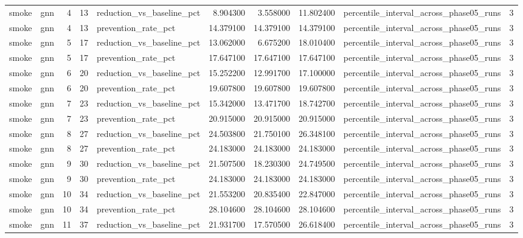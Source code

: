 \begin{tabular}{llrrlrrrlr}
smoke & gnn & 4 & 13 & reduction\_vs\_baseline\_pct & 8.904300 & 3.558000 & 11.802400 & percentile\_interval\_across\_phase05\_runs & 3 \\
smoke & gnn & 4 & 13 & prevention\_rate\_pct & 14.379100 & 14.379100 & 14.379100 & percentile\_interval\_across\_phase05\_runs & 3 \\
smoke & gnn & 5 & 17 & reduction\_vs\_baseline\_pct & 13.062000 & 6.675200 & 18.010400 & percentile\_interval\_across\_phase05\_runs & 3 \\
smoke & gnn & 5 & 17 & prevention\_rate\_pct & 17.647100 & 17.647100 & 17.647100 & percentile\_interval\_across\_phase05\_runs & 3 \\
smoke & gnn & 6 & 20 & reduction\_vs\_baseline\_pct & 15.252200 & 12.991700 & 17.100000 & percentile\_interval\_across\_phase05\_runs & 3 \\
smoke & gnn & 6 & 20 & prevention\_rate\_pct & 19.607800 & 19.607800 & 19.607800 & percentile\_interval\_across\_phase05\_runs & 3 \\
smoke & gnn & 7 & 23 & reduction\_vs\_baseline\_pct & 15.342000 & 13.471700 & 18.742700 & percentile\_interval\_across\_phase05\_runs & 3 \\
smoke & gnn & 7 & 23 & prevention\_rate\_pct & 20.915000 & 20.915000 & 20.915000 & percentile\_interval\_across\_phase05\_runs & 3 \\
smoke & gnn & 8 & 27 & reduction\_vs\_baseline\_pct & 24.503800 & 21.750100 & 26.348100 & percentile\_interval\_across\_phase05\_runs & 3 \\
smoke & gnn & 8 & 27 & prevention\_rate\_pct & 24.183000 & 24.183000 & 24.183000 & percentile\_interval\_across\_phase05\_runs & 3 \\
smoke & gnn & 9 & 30 & reduction\_vs\_baseline\_pct & 21.507500 & 18.230300 & 24.749500 & percentile\_interval\_across\_phase05\_runs & 3 \\
smoke & gnn & 9 & 30 & prevention\_rate\_pct & 24.183000 & 24.183000 & 24.183000 & percentile\_interval\_across\_phase05\_runs & 3 \\
smoke & gnn & 10 & 34 & reduction\_vs\_baseline\_pct & 21.553200 & 20.835400 & 22.847000 & percentile\_interval\_across\_phase05\_runs & 3 \\
smoke & gnn & 10 & 34 & prevention\_rate\_pct & 28.104600 & 28.104600 & 28.104600 & percentile\_interval\_across\_phase05\_runs & 3 \\
smoke & gnn & 11 & 37 & reduction\_vs\_baseline\_pct & 21.931700 & 17.570500 & 26.618400 & percentile\_interval\_across\_phase05\_runs & 3 \\

\end{tabular}
